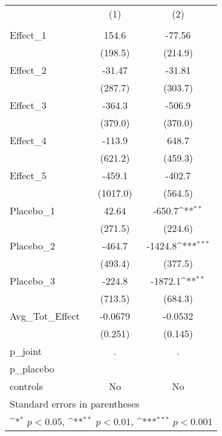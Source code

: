 {
\def\sym#1{\ifmmode^{#1}\else\(^{#1}\)\fi}
\begin{tabular}{l*{2}{c}}
\toprule
            &\multicolumn{1}{c}{(1)}&\multicolumn{1}{c}{(2)}\\
            &\multicolumn{1}{c}{} &\multicolumn{1}{c}{} \\
\midrule
Effect\_1    &       154.6         &      -77.56         \\
            &     (198.5)         &     (214.9)         \\
\addlinespace
Effect\_2    &      -31.47         &      -31.81         \\
            &     (287.7)         &     (303.7)         \\
\addlinespace
Effect\_3    &      -364.3         &      -506.9         \\
            &     (379.0)         &     (370.0)         \\
\addlinespace
Effect\_4    &      -113.9         &       648.7         \\
            &     (621.2)         &     (459.3)         \\
\addlinespace
Effect\_5    &      -459.1         &      -402.7         \\
            &    (1017.0)         &     (564.5)         \\
\addlinespace
Placebo\_1   &       42.64         &      -650.7\sym{**} \\
            &     (271.5)         &     (224.6)         \\
\addlinespace
Placebo\_2   &      -464.7         &     -1424.8\sym{***}\\
            &     (493.4)         &     (377.5)         \\
\addlinespace
Placebo\_3   &      -224.8         &     -1872.1\sym{**} \\
            &     (713.5)         &     (684.3)         \\
\addlinespace
Avg\_Tot\_Effect&     -0.0679         &     -0.0532         \\
            &     (0.251)         &     (0.145)         \\
\midrule
p\_joint     &           .         &           .         \\
p\_placebo   &                     &                     \\
controls    &          No         &          No         \\
\bottomrule
\multicolumn{3}{l}{\footnotesize Standard errors in parentheses}\\
\multicolumn{3}{l}{\footnotesize \sym{*} \(p<0.05\), \sym{**} \(p<0.01\), \sym{***} \(p<0.001\)}\\
\end{tabular}
}

